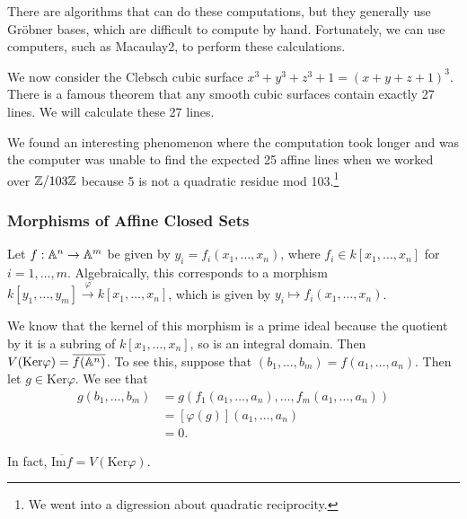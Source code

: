 \documentclass[twoside, 10pt]{article}
\begin{document}
    There are algorithms that can do these computations, but they generally use Gr\"obner bases, which are difficult to compute by hand. Fortunately, we can use computers, such as Macaulay2, to perform these calculations.

    \begin{mdframed}[style=default]
        
    \end{mdframed}

    We now consider the Clebsch cubic surface $x^3+y^3+z^3+1 = (x+y+z+1)^3$. There is a famous theorem that any smooth cubic surfaces contain exactly 27 lines. We will calculate these 27 lines.

    \begin{mdframed}[style=default]
        
    \end{mdframed}

    We found an interesting phenomenon where the computation took longer and was the computer was unable to find the expected 25 affine lines when we worked over $\mathbb{Z}/103\mathbb{Z}$ because 5 is not a quadratic residue mod 103.\footnote{We went into a digression about quadratic reciprocity.}

    \subsubsection{Morphisms of Affine Closed Sets}

    Let $f: \mathbb{A}^n \rightarrow \mathbb{A}^m$ be given by $y_i = f_i(x_1, \ldots, x_n)$, where $f_i \in k[x_1, \ldots, x_n]$ for $i = 1, \ldots, m$. Algebraically, this corresponds to a morphism $k[y_1, \ldots, y_m] \xrightarrow{\varphi} k[x_1, \ldots, x_n]$, which is given by $y_i \mapsto f_i(x_1, \ldots, x_n)$.

    We know that the kernel of this morphism is a prime ideal because the quotient by it is a subring of $k[x_1, \ldots, x_n]$, so is an integral domain. Then $V(\mathrm{Ker}\varphi) = \overline{f(\mathbb{A}^n)}$. To see this, suppose that $(b_1, \ldots, b_m) = f(a_1, \ldots, a_n)$. Then let $g \in \mathrm{Ker}\varphi$. We see that
    \begin{align*}
        g(b_1, \ldots, b_m) &= g(f_1(a_1, \ldots, a_n), \ldots, f_m(a_1, \ldots, a_n)) \\ 
        &= [\varphi(g)](a_1, \ldots, a_n) \\ 
        &= 0.
    \end{align*}
    
    In fact, $\overline{\mathrm{Im} f} = V(\mathrm{Ker}\varphi)$.
\end{document}
